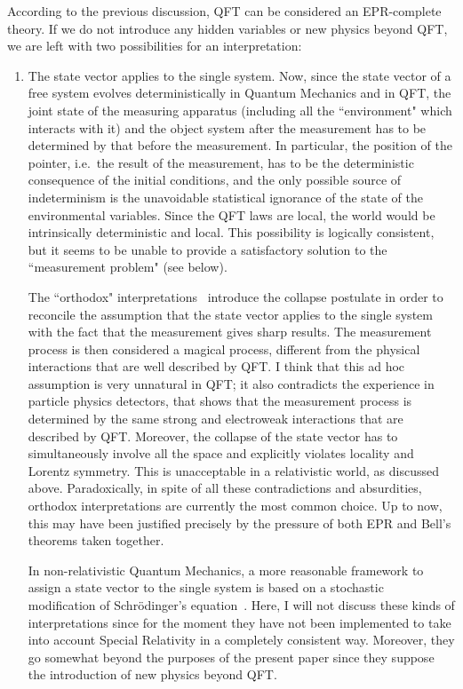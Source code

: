 \documentclass[12pt]{article}
\begin{document}
According to the previous discussion, QFT can be considered an
EPR-complete theory. If we do not introduce any hidden variables or
new physics beyond QFT, we are left with two possibilities for an
interpretation:
{\renewcommand{\theenumi}{\Roman{enumi}}  
\begin{enumerate} 
\item The state vector applies to the single system. Now, since the state
vector of a free system evolves deterministically in Quantum Mechanics
and in QFT, the joint state of the measuring apparatus (including all
the ``environment" which interacts with it) and the object system
after the measurement has to be determined by that before the
measurement. In particular, the position of the pointer, i.e.\ the
result of the measurement, has to be the deterministic consequence of
the initial conditions, and the only possible source of indeterminism
is the unavoidable statistical ignorance of the state of the
environmental variables. Since the QFT laws are local, the world would
be intrinsically deterministic and local. This possibility is
logically consistent, but it seems to be unable to provide a
satisfactory solution to the ``measurement problem" (see below).

The ``orthodox" interpretations~\cite{Laloe,Peres} introduce the
collapse postulate in order to reconcile the assumption that the
state vector applies to the single system with the fact that the
measurement gives sharp results. The measurement process is then
considered a magical process, different from the physical
interactions that are well described by QFT. I think that this ad
hoc assumption is very unnatural in QFT; it also contradicts the
experience in particle physics detectors, that shows that the
measurement process is determined by the same strong and
electroweak interactions that are described by QFT. Moreover, the
collapse of the state vector has to simultaneously involve all the
space and explicitly violates locality and Lorentz symmetry. This
is unacceptable in a relativistic world, as discussed above.
Paradoxically, in spite of all these contradictions and
absurdities, orthodox interpretations are currently the most
common choice. Up to now, this may have been justified precisely
by the pressure of both EPR and Bell's theorems taken together.

In non-relativistic Quantum Mechanics, a more reasonable framework to
assign a state vector to the single system is based on a stochastic
modification of Schr\"odinger's equation~\cite{stochastic}. Here, I
will not discuss these kinds of interpretations since for the moment
they have not been implemented to take into account Special Relativity
in a completely consistent way. Moreover, they go somewhat beyond the
purposes of the present paper since they suppose the introduction of
new physics beyond QFT.


\end{enumerate}}
\end{document}
